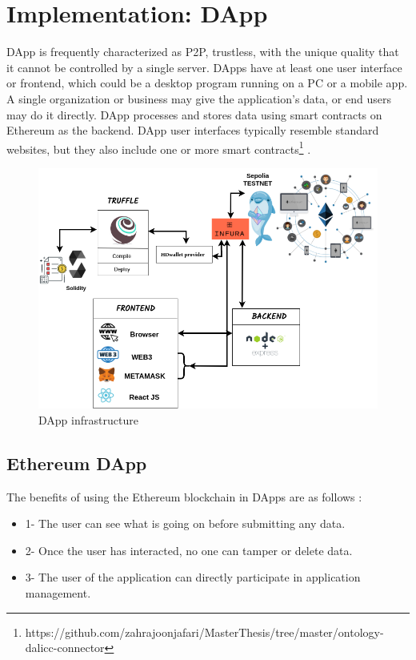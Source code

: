 \chapter{Implementation: DApp}
DApp is frequently characterized as P2P, trustless, with the unique quality that it cannot be controlled by a single server. DApps have at least one user interface or frontend, which could be a desktop program running on a PC or a mobile app.
A single organization or business may give the application's data, or end users may do it directly.
DApp processes and stores data using smart contracts on Ethereum as the backend. DApp user interfaces typically resemble standard websites, but they also include one or more smart contracts\footnote{https://github.com/zahrajoonjafari/MasterThesis/tree/master/ontology-dalicc-connector} \cite{William}.

\begin{center}
	
	\begin{figure}[htb!]
		
		\begin{minipage}{0.75\linewidth}
			
			\includegraphics[width=1.45\textwidth]{images/chap03_dapp.png}
		\end{minipage}
		\caption{DApp infrastructure}
		
	\end{figure}
	
\end{center}

\section{Ethereum DApp}
The benefits of using the Ethereum blockchain in DApps are as follows \cite{William}:
\begin{itemize}
    \item 1- The user can see what is going on before submitting any data.
    \item 2- Once the user has interacted, no one can tamper or delete data.
    \item 3- The user of the application can directly participate in application management.
\end{itemize}
